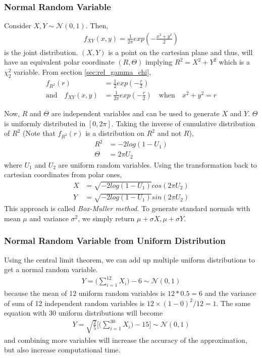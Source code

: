 \documentclass[../probability-notes.tex]{subfiles}
\begin{document}
    \subsubsection{Normal Random Variable}
    Consider $X, Y \sim \mathcal{N}(0, 1)$. Then,
    \begin{align*}
        f_{XY}(x,y) = \frac{1}{2\pi}exp(-\frac{x^{2}+y^{2}}{2})
    \end{align*}
    is the joint distribution. $(X, Y)$ is a point on the cartesian plane and thus, will have an equivalent polar coordinate $(R, \Theta)$ implying $R^{2} = X^{2} + Y^{2}$ which is a $\chi_{2}^{2}$ variable. From section \ref{sec:rel_gamma_chi},
    \begin{align*}
       f_{R^{2}}(r) &= \frac{1}{2}exp(-\frac{r}{2})\\
       \text{and} \quad f_{XY}(x,y) &= \frac{1}{2\pi} exp(-\frac{r}{2}) \quad \text{when} \quad x^{2} + y^{2} = r
    \end{align*}

    Now, $R$ and $\Theta$ are independent variables and can be used to generate $X$ and $Y$. $\Theta$ is uniformly distributed in $[0, 2\pi]$. Taking the inverse of cumulative distribution of $R^{2}$ (Note that $f_{R^{2}}(r)$ is a distribution on $R^{2}$ and not $R$),
    \begin{align*}
        R^{2} &= -2log(1 - U_{1})\\
        \Theta &= 2\pi U_{2}
    \end{align*}
    where $U_{1}$ and $U_{2}$ are uniform random variables. Using the transformation back to cartesian coordinates from polar ones,
    \begin{align*}
        X &= \sqrt{-2log(1 - U_{1})}cos(2\pi U_{2})\\
        Y &= \sqrt{-2log(1 - U_{1})}sin(2\pi U_{2})
    \end{align*}
    This approach is called \emph{Box-Muller method}. To generate standard normals with mean $\mu$ and variance $\sigma^{2}$, we simply return $\mu + \sigma X, \mu+\sigma Y$.

    
    \subsubsection{Normal Random Variable from Uniform Distribution}
    Using the central limit theorem, we can add up multiple uniform distributions to get a normal random variable.
    \begin{gather*}
        Y = \bigg(\sum_{i=1}^{12}X_{i} \bigg) - 6 \sim \mathcal{N}(0,1)
    \end{gather*}
    because the mean of 12 uniform random variables is $12 * 0.5 = 6$ and the variance of sum of 12 independent random variables is $12 \times (1-0)^{2}/12 = 1$. The same equation with 30 uniform distributions will become
    \begin{gather*}
        Y = \sqrt{\frac{2}{5}}\bigg[\bigg(\sum_{i=1}^{30}X_{i} \bigg) - 15\bigg] \sim \mathcal{N}(0,1)
    \end{gather*}
    and combining more variables will increase the accuracy of the approximation, but also increase computational time.
\end{document}
